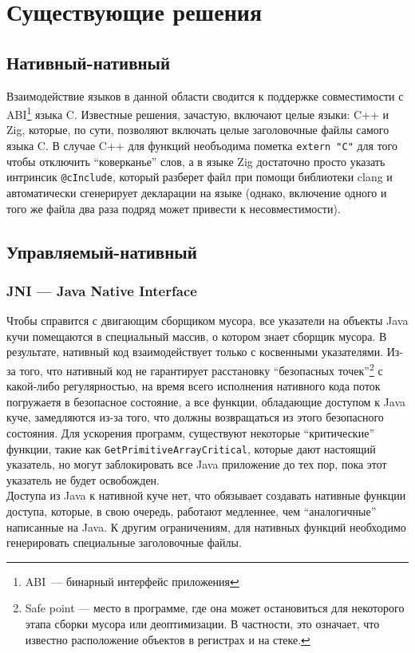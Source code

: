 \documentclass[times,specification,annotation]{itmo-student-thesis}
\begin{document}
\section{Существующие решения}
\subsection{Нативный-нативный}
Взаимодействие языков в данной области сводится к поддержке совместимости с ABI\footnote{ABI~--- бинарный интерфейс приложения} языка C. Известные решения, зачастую, включают целые языки: C++ и Zig, которые, по сути, позволяют включать целые заголовочные файлы самого языка C. В случае C++ для функций необъодима пометка \texttt{extern "C"} для того чтобы отключить ``коверканье'' слов, а в языке Zig достаточно просто указать интринсик \texttt{@cInclude}, который разберет файл при помощи библиотеки clang и автоматически сгенерирует декларации на языке (однако, включение одного и того же файла два раза подряд может привести к несовместимости).

\subsection{Управляемый-нативный}
\subsubsection{JNI --- Java Native Interface}
Чтобы справится с двигающим сборщиком мусора, все указатели на объекты Java кучи помещаются в специальный массив, о котором знает сборщик мусора. В результате, нативный код взаимодействует только с косвенными указателями. Из-за того, что нативный код не гарантирует расстановку ``безопасных точек''\footnote{Safe point --- место в программе, где она может остановиться для некоторого этапа сборки мусора или деоптимизации. В частности, это означает, что известно расположение объектов в регистрах и на стеке.} с какой-либо регулярностью, на время всего исполнения нативного кода поток погружаетя в безопасное состояние, а все функции, обладающие доступом к Java куче, замедляются из-за того, что должны возвращаться из этого безопасного состояния. Для ускорения программ, существуют некоторые ``критические'' функции, такие как \texttt{GetPrimitiveArrayCritical}, которые дают настоящий указатель, но могут заблокировать все Java приложение до тех пор, пока этот указатель не будет освобожден.\\
Доступа из Java к нативной куче нет, что обязывает создавать нативные функции доступа, которые, в свою очередь, работают медленнее, чем ``аналогичные'' написанные на Java. К другим ограничениям, для нативных функций необходимо генерировать специальные заголовочные файлы.\\
\end{document}
